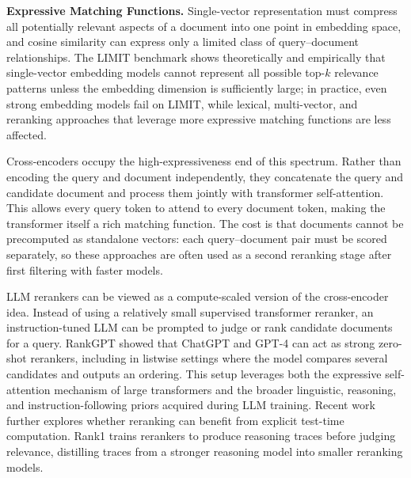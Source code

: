 \noindent\textbf{Expressive Matching Functions.}
Single-vector representation must compress all potentially relevant aspects of a document into one point in embedding space, and cosine similarity can express only a limited class of query--document relationships. The LIMIT benchmark  shows theoretically and empirically that single-vector embedding models cannot represent all possible top-$k$ relevance patterns unless the embedding dimension is sufficiently large; in practice, even strong embedding models fail on LIMIT, while lexical, multi-vector, and reranking approaches that leverage more expressive matching functions are less affected.

Cross-encoders  occupy the high-expressiveness end of this spectrum. Rather than encoding the query and document independently, they concatenate the query and candidate document and process them jointly with transformer self-attention. This allows every query token to attend to every document token, making the transformer itself a rich matching function. The cost is that documents cannot be precomputed as standalone vectors: each query--document pair must be scored separately, so these approaches are often used as a second reranking stage after first filtering with faster models.

LLM rerankers can be viewed as a compute-scaled version of the cross-encoder idea. Instead of using a relatively small supervised transformer reranker, an instruction-tuned LLM can be prompted to judge or rank candidate documents for a query. RankGPT  showed that ChatGPT and GPT-4 can act as strong zero-shot rerankers, including in listwise settings where the model compares several candidates and outputs an ordering. This setup leverages both the expressive self-attention mechanism of large transformers and the broader linguistic, reasoning, and instruction-following priors acquired during LLM training. Recent work further explores whether reranking can benefit from explicit test-time computation. Rank1  trains rerankers to produce reasoning traces before judging relevance, distilling traces from a stronger reasoning model into smaller reranking models.

